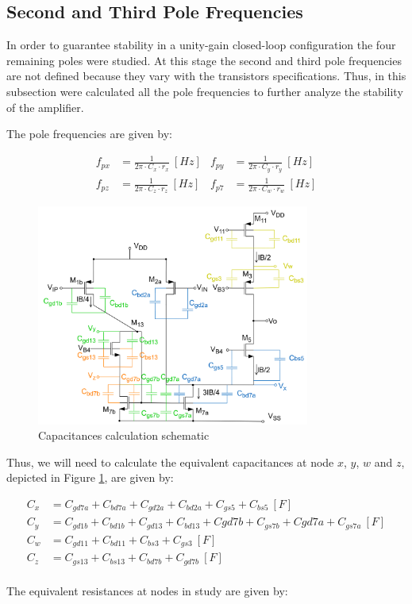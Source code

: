 \subsection{Second and Third Pole Frequencies}
In order to guarantee stability in a unity-gain closed-loop configuration the four remaining poles were studied. At this stage the second and third pole frequencies are not defined because they vary with the transistors specifications. Thus, in this subsection were calculated all the pole frequencies to further analyze the stability of the amplifier. 

The pole frequencies are given by:

\begin{align}
    f_{px} &= \frac{1}{2\pi \cdot C_x \cdot r_x} \ [Hz] &
    f_{py} &= \frac{1}{2\pi \cdot C_y \cdot r_y} \ [Hz] \\
    f_{pz} &= \frac{1}{2\pi \cdot C_z \cdot r_z} \ [Hz] &
    f_{p7} &= \frac{1}{2\pi \cdot C_w \cdot r_w} \ [Hz]
    \label{eq:poles}
\end{align}

\begin{figure}[H]
    \centering
    \includegraphics[width=0.8\textwidth]{Images/pole_freqs.png}
    \caption{Capacitances calculation schematic}
    \label{fig:poles_sch}
\end{figure}

Thus, we will need to calculate the equivalent capacitances at node $x$, $y$, $w$ and $z$, depicted in Figure \ref{fig:poles_sch}, are given by:

\begin{align}
    C_x &= C_{gd7a} + C_{bd7a}+ C_{gd2a} + C_{bd2a} + C_{gs5} + C_{bs5} \ [F] \\
    C_y &= C_{gd1b} + C_{bd1b} + C_{gd13} + C_{bd13} + C{gd7b} + C_{gs7b} + C{gd7a} + C_{gs7a}\ [F] \\
    C_w &= C_{gd11} + C_{bd11} + C_{bs3}+ C_{gs3} \ [F] \\
    C_z &= C_{gs13} + C_{bs13} + C_{bd7b}+ C_{gd7b} \ [F] 
    \label{eq:capacitances}
\end{align}
\\
The equivalent resistances at nodes in study are given by:

